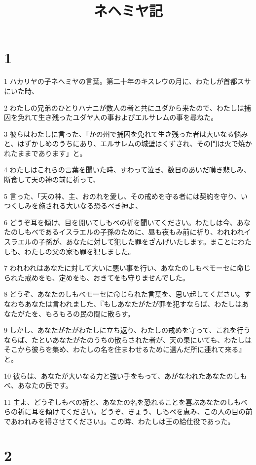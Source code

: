 

\title{ネヘミヤ記}


\chapter{1}

\par 1 ハカリヤの子ネヘミヤの言葉。第二十年のキスレウの月に、わたしが首都スサにいた時、
\par 2 わたしの兄弟のひとりハナニが数人の者と共にユダから来たので、わたしは捕囚を免れて生き残ったユダヤ人の事およびエルサレムの事を尋ねた。
\par 3 彼らはわたしに言った、「かの州で捕囚を免れて生き残った者は大いなる悩みと、はずかしめのうちにあり、エルサレムの城壁はくずされ、その門は火で焼かれたままであります」と。
\par 4 わたしはこれらの言葉を聞いた時、すわって泣き、数日のあいだ嘆き悲しみ、断食して天の神の前に祈って、
\par 5 言った、「天の神、主、おのれを愛し、その戒めを守る者には契約を守り、いつくしみを施される大いなる恐るべき神よ、
\par 6 どうぞ耳を傾け、目を開いてしもべの祈を聞いてください。わたしは今、あなたのしもべであるイスラエルの子孫のために、昼も夜もみ前に祈り、われわれイスラエルの子孫が、あなたに対して犯した罪をざんげいたします。まことにわたしも、わたしの父の家も罪を犯しました。
\par 7 われわれはあなたに対して大いに悪い事を行い、あなたのしもべモーセに命じられた戒めをも、定めをも、おきてをも守りませんでした。
\par 8 どうぞ、あなたのしもべモーセに命じられた言葉を、思い起してください。すなわちあなたは言われました、『もしあなたがたが罪を犯すならば、わたしはあなたがたを、もろもろの民の間に散らす。
\par 9 しかし、あなたがたがわたしに立ち返り、わたしの戒めを守って、これを行うならば、たといあなたがたのうちの散らされた者が、天の果にいても、わたしはそこから彼らを集め、わたしの名を住まわせるために選んだ所に連れて来る』と。
\par 10 彼らは、あなたが大いなる力と強い手をもって、あがなわれたあなたのしもべ、あなたの民です。
\par 11 主よ、どうぞしもべの祈と、あなたの名を恐れることを喜ぶあなたのしもべらの祈に耳を傾けてください。どうぞ、きょう、しもべを恵み、この人の目の前であわれみを得させてください」。この時、わたしは王の給仕役であった。

\chapter{2}

